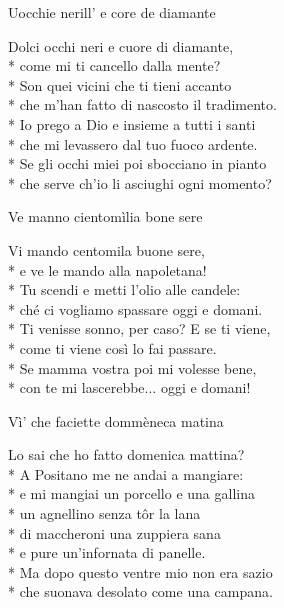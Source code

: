 \documentclass[11pt]{book}
\begin{document}
\begin{poem}{Uocchie nerill’ e core de diamante}{}
\settowidth{\versewidth}{Che m’han fatto di nascosto il tradimento}
\begin{altverse}
Dolci occhi neri e cuore di diamante,\\*
come mi ti cancello dalla mente?\\*
Son quei vicini che ti tieni accanto\\*
che m’han fatto di nascosto il tradimento.\\*
Io prego a Dio e insieme a tutti i santi\\*
che mi levassero dal tuo fuoco ardente.\\*
Se gli occhi miei poi sbocciano in pianto\\*
che serve ch’io li asciughi ogni momento?
\end{altverse}
\end{poem}

\begin{poem}{Ve manno cientomìlia bone sere}{}
\settowidth{\versewidth}{Ti venisse sonno, per caso? E se ti viene}
\begin{altverse}
Vi mando centomila buone sere,\\*
e ve le mando alla napoletana!\\*
Tu scendi e metti l’olio alle candele:\\*
ché ci vogliamo spassare oggi e domani.\\*
Ti venisse sonno, per caso? E se ti viene,\\*
come ti viene così lo fai passare.\\*
Se mamma vostra poi mi volesse bene,\\*
con te mi lascerebbe... oggi e domani!
\end{altverse}
\end{poem}

\begin{poem}{Vì’ che faciette dommèneca matina}{}
\settowidth{\versewidth}{Ma dopo questo ventre mio non era sazio}
\begin{altverse}
Lo sai che ho fatto domenica mattina?\\*
A Positano me ne andai a mangiare:\\*
e mi mangiai un porcello e una gallina\\*
un agnellino senza tôr la lana\\*
di maccheroni una zuppiera sana\\*
e pure un’infornata di panelle.\\*
Ma dopo questo ventre mio non era sazio\\*
che suonava desolato come una campana.
\end{altverse}
\end{poem}
\end{document}
